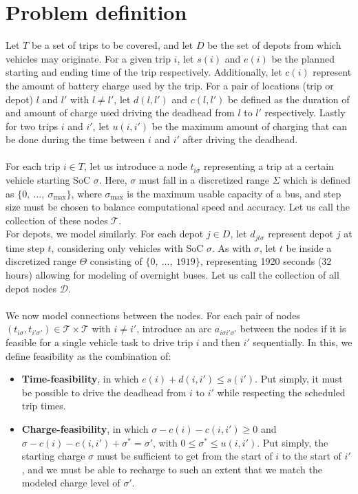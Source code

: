 \documentclass[]{book}
\begin{document}
\section{Problem definition}
\label{sec:problem_def}
Let $T$ be a set of trips to be covered, and let $D$ be the set of depots from which vehicles may originate. For a given trip $i$, let $s(i)$ and $e(i)$ be the planned starting and ending time of the trip respectively. Additionally, let $c(i)$ represent the amount of battery charge used by the trip. For a pair of locations (trip or depot) $l$ and $l'$ with $l \neq l'$, let $d(l, l')$ and $c(l, l')$ be defined as the duration of and amount of charge used driving the deadhead from $l$ to $l'$ respectively. Lastly for two trips $i$ and $i'$, let $u(i, i')$ be the maximum amount of charging that can be done during the time between $i$ and $i'$ after driving the deadhead.  \\\\
For each trip $i \in T$, let us introduce a node $t_{i\sigma}$ representing a trip at a certain vehicle starting SoC $\sigma$. Here, $\sigma$ must fall in a discretized range $\Sigma$ which is defined as $\{0,\:\dots,\:\sigma_{\max}\}$, where $\sigma_{\max}$ is the maximum usable capacity of a bus, and step size must be chosen to balance computational speed and accuracy. Let us call the collection of these nodes $\mathcal{T}$.\\
\noindent For depots, we model similarly. For each depot $j \in D$, let $d_{jt\sigma}$ represent depot $j$ at time step $t$, considering only vehicles with SoC $\sigma$. As with $\sigma$, let $t$ be inside a discretized range $\Theta$ consisting of $\{0,\:\dots,\:1919\}$, representing 1920 seconds (32 hours) allowing for modeling of overnight buses. Let us call the collection of all depot nodes $\mathcal{D}$. \\\\
We now model connections between the nodes. For each pair of nodes $(t_{i\sigma}, t_{i'\sigma'}) \in \mathcal{T} \times \mathcal{T}$ with $i \neq i'$, introduce an arc $a_{i\sigma i'\sigma'}$ between the nodes if it is feasible for a single vehicle task to drive trip $i$ and then $i'$ sequentially. In this, we define feasibility as the combination of:
\begin{itemize}
  \item \textbf{Time-feasibility}, in which $e(i) + d(i, i') \leq s(i')$. Put simply, it must be possible to drive the deadhead from $i$ to $i'$ while respecting the scheduled trip times.
  \item \textbf{Charge-feasibility}, in which $\sigma - c(i) - c(i, i') \geq 0$ and $\sigma - c(i) - c(i, i') + \sigma^* = \sigma'$, with $0 \leq \sigma^* \leq u(i, i')$. Put simply, the starting charge $\sigma$ must be sufficient to get from the start of $i$ to the start of $i'$, and we must be able to recharge to such an extent that we match the modeled charge level of $\sigma'$.
\end{itemize}
\end{document}
